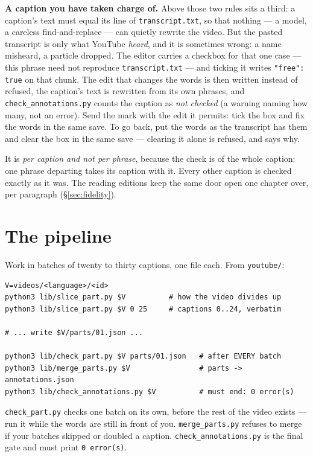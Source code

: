 \documentclass[11pt,oneside]{report}
\newcommand{\file}[1]{\texttt{#1}}
\newcommand{\menu}[1]{\textsf{#1}}
\begin{document}
\textbf{A caption you have taken charge of.} Above those two rules sits a
third: a caption's text must equal its line of \file{transcript.txt}, so
that nothing --- a model, a careless find-and-replace --- can quietly
rewrite the video. But the pasted transcript is only what YouTube
\emph{heard}, and it is sometimes wrong: a name misheard, a particle
dropped. The editor carries a checkbox for that one case ---
\menu{this phrase need not reproduce \file{transcript.txt}} --- and ticking
it writes \texttt{"free": true} on that chunk. The edit that changes the
words is then written instead of refused, the caption's text is rewritten
from its own phrases, and \file{check\_annotations.py} counts the caption as
\emph{not checked} (a warning naming how many, not an error). Send the
mark with the edit it permits: tick the box and fix the words in the same
save. To go back, put the words as the transcript has them and clear the
box in the same save --- clearing it alone is refused, and says why.

It is \emph{per caption and not per phrase}, because the check is of the
whole caption: one phrase departing takes its caption with it. Every other
caption is checked exactly as it was. The reading editions keep the same
door open one chapter over, per paragraph (\S\ref{sec:fidelity}).

\section{The pipeline}

Work in batches of twenty to thirty captions, one file each. From
\file{youtube/}:

\begin{lstlisting}
V=videos/<language>/<id>
python3 lib/slice_part.py $V          # how the video divides up
python3 lib/slice_part.py $V 0 25     # captions 0..24, verbatim

# ... write $V/parts/01.json ...

python3 lib/check_part.py $V parts/01.json   # after EVERY batch
python3 lib/merge_parts.py $V                # parts -> annotations.json
python3 lib/check_annotations.py $V          # must end: 0 error(s)
\end{lstlisting}

\file{check\_part.py} checks one batch on its own, before the rest of the
video exists --- run it while the words are still in front of you.
\file{merge\_parts.py} refuses to merge if your batches skipped or doubled a
caption. \file{check\_annotations.py} is the final gate and must print
\texttt{0 error(s)}.
\end{document}
